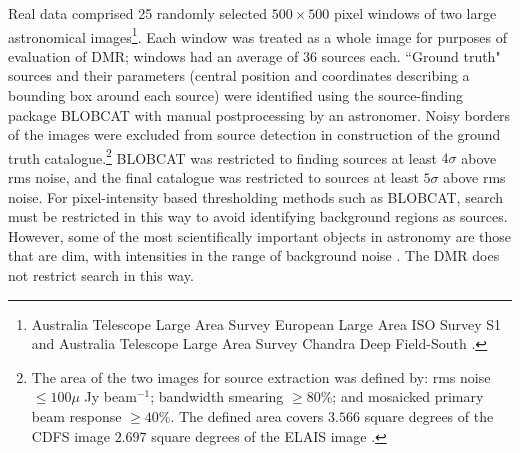\documentclass[
    ,final            %
  ]
  {aipproc}
\begin{document}
Real data comprised 25 randomly selected $500 \times 500$ pixel windows of two large astronomical images\footnote{Australia Telescope Large Area Survey European Large Area ISO Survey S1 and Australia Telescope Large Area Survey Chandra Deep Field-South \cite{norris2006deep}.}. Each window was treated as a whole image for purposes of evaluation of DMR; windows had an average of $36$ sources each.%
``Ground truth" sources and their parameters (central position and coordinates describing a bounding box around each source) were identified using the source-finding package BLOBCAT \cite{hales2012blobcat} with manual postprocessing by an astronomer. Noisy borders of the images were excluded from source detection in construction of the ground truth catalogue.\footnote{The area of the two images for source extraction was defined by: rms noise $\le 100 \mu$ Jy beam$^{−1}$; bandwidth smearing $ \ge 80\%$; and mosaicked primary beam response $\ge 40\%$. The defined area covers $3.566$ square degrees of the CDFS image $2.697$ square degrees of the ELAIS image \cite{banfield2013australia}.} BLOBCAT was restricted to finding sources at least $4 \sigma$ above rms noise, and the final catalogue was restricted to sources at least $5 \sigma$ above rms noise. For pixel-intensity based thresholding methods such as BLOBCAT, search must be restricted in this way to avoid identifying background regions as sources. However, some of the most scientifically important objects in astronomy are those that are dim, with intensities in the range of background noise \cite{norris2011emu}. The DMR does not restrict search in this way.
\end{document}
